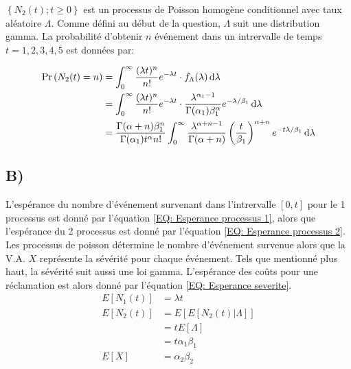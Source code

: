\documentclass[12pt, french]{report}
\begin{document}
\newpage
$\left\{ N_2(t);t \geq 0 \right\}$ est un processus de Poisson homogène conditionnel avec taux aléatoire $\Lambda$.
Comme défini au début de la question, $\Lambda$ suit une distribution gamma.
La probabilité d'obtenir $n$ événement dans un intrervalle de temps $t = 1,2,3,4,5$ est données par:

\begin{align}
    \label{EQ:Prob processus 2}
    \Pr \left( N_2(t)=n \right) &= \int_0^\infty \frac{(\lambda t)^n}{n!} e^{-\lambda t} \cdot f_\Lambda(\lambda)  \mathop{}\!\mathrm{d}\lambda \\
                    &= \int_0^\infty \frac{(\lambda t)^n}{n!} e^{-\lambda t} \cdot \frac{\lambda^{\alpha_1-1}}{\Gamma{(\alpha_1)} \beta_1^\alpha} e^{-\lambda / \beta_1} \mathop{}\!\mathrm{d}\lambda \\
                    &= \frac{\Gamma{(\alpha + n)} \beta_1^n}{\Gamma{(\alpha_1)} t^\alpha n!} \int_0^\infty \frac{\lambda^{\alpha+n-1}}{\Gamma{(\alpha + n)}} \left( \frac{t}{\beta_1} \right)^{\alpha + n} e^{-t \lambda / \beta_1} \mathop{}\!\mathrm{d}\lambda
\end{align}


\subsection*{B)}
L'espérance du nombre d'événement survenant dans l'intrervalle $[0,t]$ pour le 1 processus est donné par l'équation \ref{EQ: Esperance processus 1}, alors 
que l'espérance du 2 processus est donné par l'équation \ref{EQ: Esperance processus 2}. Les processus de poisson détermine le nombre d'événement survenue 
alors que la V.A. $X$ représente la sévérité pour chaque événement. Tels que mentionné plus haut, la sévérité suit aussi une loi gamma. L'espérance des coûts pour une réclamation est 
alors donné par l'équation \ref{EQ: Esperance severite}.
\begin{align}
    \label{EQ: Esperance processus 1}
    E[N_1(t)] &= \lambda t \\ 
    \label{EQ: Esperance processus 2}
    E[N_2(t)] &= E[E[N_2(t)|\Lambda]] \nonumber \\
              &= t E[\Lambda] \nonumber\\
              &= t \alpha_1 \beta_1 \\
    \label{EQ: Esperance severite}
    E[X] &= \alpha_2 \beta_2
\end{align}
\end{document}
